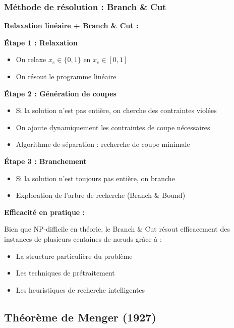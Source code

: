 \documentclass[12pt,a4paper]{article}
\begin{document}
\subsubsection{Méthode de résolution : Branch \& Cut}

\begin{algorithme}
\textbf{Relaxation linéaire + Branch \& Cut :}

\textbf{Étape 1 : Relaxation}
\begin{itemize}
    \item On relaxe $x_e \in \{0,1\}$ en $x_e \in [0,1]$
    \item On résout le programme linéaire
\end{itemize}

\textbf{Étape 2 : Génération de coupes}
\begin{itemize}
    \item Si la solution n'est pas entière, on cherche des contraintes violées
    \item On ajoute dynamiquement les contraintes de coupe nécessaires
    \item Algorithme de séparation : recherche de coupe minimale
\end{itemize}

\textbf{Étape 3 : Branchement}
\begin{itemize}
    \item Si la solution n'est toujours pas entière, on branche
    \item Exploration de l'arbre de recherche (Branch \& Bound)
\end{itemize}
\end{algorithme}

\begin{astuce}
\textbf{Efficacité en pratique :}

Bien que NP-difficile en théorie, le Branch \& Cut résout efficacement des instances de plusieurs centaines de nœuds grâce à :
\begin{itemize}
    \item La structure particulière du problème
    \item Les techniques de prétraitement
    \item Les heuristiques de recherche intelligentes
\end{itemize}
\end{astuce}

\newpage
\subsection{Théorème de Menger (1927)}
\end{document}

